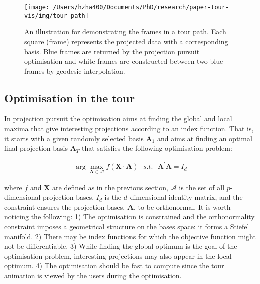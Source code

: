 \begin{Schunk}
\begin{figure}

{\centering \texttt{[image: /Users/hzha400/Documents/PhD/research/paper-tour-vis/img/tour-path]} 

}

\caption[An illustration for demonstrating the frames in a tour path]{An illustration for demonstrating the frames in a tour path. Each square (frame) represents the projected data with a corresponding basis. Blue frames are returned by the projection pursuit optimisation and white frames are constructed between two blue frames by geodesic interpolation.}\label{fig:tour-path}
\end{figure}
\end{Schunk}

\hypertarget{tour-optim}{%
\subsection{Optimisation in the tour}\label{tour-optim}}

In projection pursuit the optimisation aims at finding the global and
local maxima that give interesting projections according to an index
function. That is, it starts with a given randomly selected basis
\(\mathbf{A}_1\) and aims at finding an optimal final projection basis
\(\mathbf{A}_T\) that satisfies the following optimisation problem:

\begin{align}
\arg \max_{\mathbf{A} \in \mathcal{A}} f(\mathbf{X} \cdot \mathbf{A})  ~~~ s.t. ~~~ \mathbf{A}^{\prime} \mathbf{A} = I_d
\end{align}

\noindent where \(f\) and \(\mathbf{X}\) are defined as in the previous
section, \(\mathcal{A}\) is the set of all \(p\)-dimensional projection
bases, \(I_d\) is the \(d\)-dimensional identity matrix, and the
constraint ensures the projection bases, \(\mathbf{A}\), to be
orthonormal. It is worth noticing the following: 1) The optimisation is
constrained and the orthonormality constraint imposes a geometrical
structure on the bases space: it forms a Stiefel manifold. 2) There may
be index functions for which the objective function might not be
differentiable. 3) While finding the global optimum is the goal of the
optimisation problem, interesting projections may also appear in the
local optimum. 4) The optimisation should be fast to compute since the
tour animation is viewed by the users during the optimisation.

